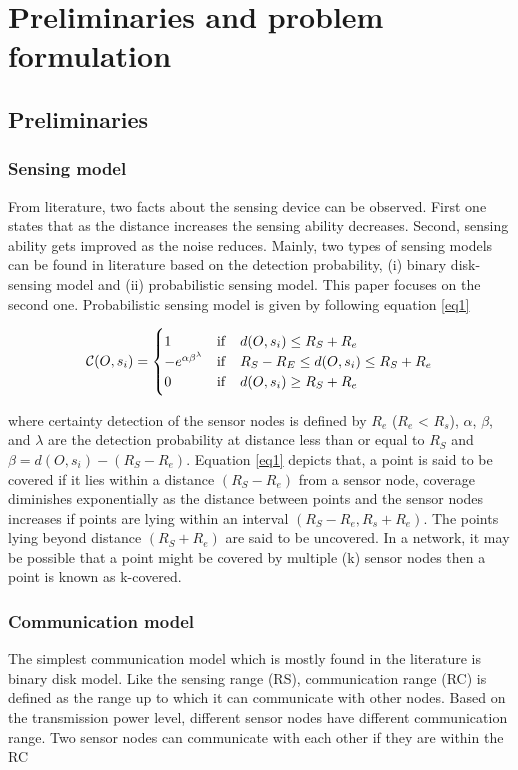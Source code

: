 \documentclass[preprint,12pt]{elsarticle}
\begin{document}
\section{Preliminaries and problem formulation}\label{problem}
\subsection{Preliminaries}
\subsubsection{Sensing model}
From literature, two facts about the sensing device can be observed. First one states
that as the distance increases the sensing ability decreases. Second, sensing ability
gets improved as the noise reduces. Mainly, two types of sensing models can be
found in literature based on the detection probability, (i) binary disk-sensing model
and (ii) probabilistic sensing model. This paper focuses on the second one. Probabilistic sensing model is given by following equation \ref{eq1}

\begin{equation}
    \label{eq1}
    \mathcal{C}(O, s_i) = \begin{cases}
        1                          & {\rm{if } } \quad  d(O,s_i) \le R_S +R_e             \\
        -e^{{\alpha\beta^\lambda}} & {\rm{if } } \quad  R_S-R_E \le d(O,s_i) \le R_S+ R_e \\
        0                          & {\rm{if } } \quad  d(O, s_i) \ge R_S+R_e             \\
    \end{cases}
\end{equation}

where certainty detection of the sensor nodes is defined by $R_e$ ($R_e$ < $R_s$), $\alpha$, $\beta$, and $\lambda$
are the detection probability at distance less than or equal to $R_S$ and
$\beta =
    d(O, s_i) - (R_S - R_e)$.
Equation \ref{eq1} depicts that, a point is said to be covered if it lies within a distance $(R_S - R_e)$ from a sensor node, coverage diminishes exponentially as the distance between points and the sensor nodes increases if points are lying within an interval $(R_S - R_e, R_s + R_e)$. The points lying beyond distance $(R_S + R_e)$ are said to be uncovered. In a network, it may be possible that a point might be covered by multiple (k) sensor nodes then a point is known as k-covered.
\subsubsection{Communication model}
The simplest communication model which is mostly found in the literature is binary
disk model. Like the sensing range (RS), communication range (RC) is defined as the
range up to which it can communicate with other nodes. Based on the transmission
power level, different sensor nodes have different communication range. Two sensor
nodes can communicate with each other if they are within the RC
\end{document}
